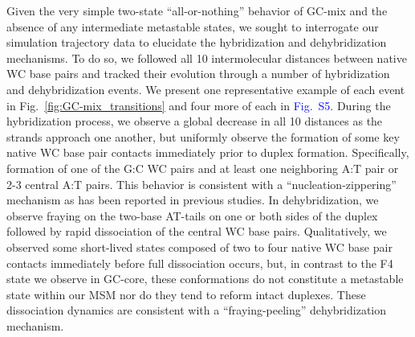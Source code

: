 \documentclass[journal=jpcbfk,manuscript=article]{achemso}
\newcommand*{\blauw}[1]{\textcolor{blue}{#1}}
\begin{document}

Given the very simple two-state ``all-or-nothing'' behavior of GC-mix and the absence of any intermediate metastable states, we sought to interrogate our simulation trajectory data to elucidate the hybridization and dehybridization mechanisms. To do so, we followed all 10 intermolecular distances between native WC base pairs and tracked their evolution through a number of hybridization and dehybridization events. We present one representative example of each event in Fig.~\ref{fig:GC-mix_transitions} and four more of each in \blauw{Fig.~S5}. During the hybridization process, we observe a global decrease in all 10 distances as the strands approach one another, but uniformly observe the formation of some key native WC base pair contacts immediately prior to duplex formation. Specifically, formation of one of the G:C WC pairs and at least one neighboring A:T pair or 2-3 central A:T pairs. This behavior is consistent with a ``nucleation-zippering'' mechanism as has been reported in previous studies.\citep{Wetmur1968KineticsDNA, Porschke1971CooperativeTransition, Sambriski2009SequencePathways,  Yin2011KineticsHybridization} In dehybridization, we observe fraying on the two-base AT-tails on one or both sides of the duplex followed by rapid dissociation of the central WC base pairs. Qualitatively, we observed some short-lived states composed of two to four native WC base pair contacts immediately before full dissociation occurs, but, in contrast to the F4 state we observe in GC-core, these conformations do not constitute a metastable state within our MSM nor do they tend to reform intact duplexes. These dissociation dynamics are consistent with a ``fraying-peeling'' dehybridization mechanism.\citep{Wong2008TheSimulations, Perez2010Real-timeUnfolding, Zgarbova2014BaseRNA} 
\end{document}
